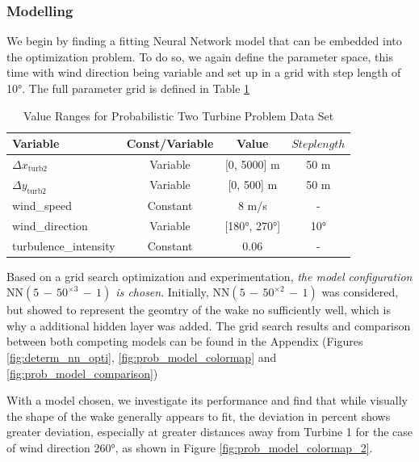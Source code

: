 \documentclass[preprint,12pt]{elsarticle}
\begin{document}
\subsubsection{Modelling}

We begin by finding a fitting Neural Network model that can be embedded into the optimization problem. To do so, we again define the parameter space, this time with wind direction being variable and set up in a grid with step length of 10°. The full parameter grid is defined in Table \ref{tab:val_prob_data}

\begin{table}[ht]
	\centering
	\caption{Value Ranges for Probabilistic Two Turbine Problem Data Set}
	\begin{tabular}{|l|c|c|c|}
		\hline
		\textbf{Variable} & \textbf{Const/Variable} & \textbf{Value} & \textbf{$Steplength$}\\
		\hline
		$\Delta x_{\text{turb2}}$ & Variable & [0, 5000] m & 50 m\\
		$\Delta y_{\text{turb2}}$ & Variable & [0, 500] m  & 50 m\\
		wind\_speed & Constant & 8 m/s & -\\
		wind\_direction & Variable & [180°, 270°]& 10° \\
		turbulence\_intensity & Constant & 0.06 & - \\
		\hline
	\end{tabular}
	\label{tab:val_prob_data}
\end{table}

Based on a grid search optimization and experimentation,  \textit{the model configuration $\text{NN}(5\,{-}\,50^{\times3}\,{-}\,1)$  is chosen}. Initially, $\text{NN}(5\,{-}\,50^{\times2}\,{-}\,1)$ was considered, but showed to represent the geomtry of the wake no sufficiently well, which is why a additional hidden layer was added. The grid search results and comparison between both competing models can be found in the Appendix (Figures \ref{fig:determ_nn_opti},  \ref{fig:prob_model_colormap} and \ref{fig:prob_model_comparison})



With a model chosen, we investigate its performance and find that while visually the shape of the wake generally appears to fit, the deviation in percent shows greater deviation, especially at greater distances away from Turbine 1 for the case of wind direction 260°, as shown in Figure \ref{fig:prob_model_colormap_2}.
\end{document}
